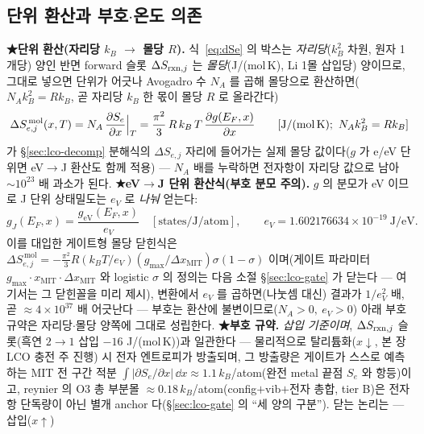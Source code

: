\subsection{단위 환산과 부호$\cdot$온도 의존}\label{sec:lco-Se-units}
\textbf{★단위 환산(자리당 $k_B$ $\to$ 몰당 $R$).} 식~\eqref{eq:dSe} 의 박스는 \emph{자리당}($k_B^2$ 차원, 원자 1개당) 양인 반면 forward 슬롯
$\Delta S_{\mathrm{rxn},j}$ 는 \emph{몰당}(J/(mol\,K), Li 1몰 삽입당) 양이므로, 그대로 넣으면 단위가 어긋나 Avogadro 수
$N_A$ 를 곱해 몰당으로 환산하면($N_A k_B^2=R k_B$, 곧 자리당 $k_B$ 한 몫이 몰당 $R$ 로 올라간다)
\begin{equation}
\Delta S_{e,j}^{\,\mathrm{mol}}(x,T)=N_A\,\frac{\partial S_e}{\partial x}\Big|_T
=\frac{\pi^2}{3}\,R\,k_B\,T\,\frac{\partial g(E_F,x)}{\partial x}
\qquad[\text{J/(mol\,K)};\ N_A k_B^2=R k_B]
\label{eq:dSemolar}
\end{equation}
가 \S\ref{sec:lco-decomp} 분해식의 $\Delta S_{e,j}$ 자리에 들어가는 실제 몰당 값이다($g$ 가 e/eV 단위면 eV$\to$J
환산도 함께 적용) --- $N_A$ 배를 누락하면 전자항이 자리당 값으로 남아 $\sim10^{23}$ 배 과소가 된다.
\textbf{★eV$\to$J 단위 환산식(부호 분모 주의).} $g$ 의 분모가 eV 이므로 J 단위 상태밀도는 $e_V$ 로 \emph{나눠} 얻는다:
\begin{equation}
g_J(E_F,x)=\frac{g_{\mathrm{eV}}(E_F,x)}{e_V}\quad[\text{states/J/atom}],
\qquad e_V=1.602176634\times10^{-19}\ \text{J/eV}.
\label{eq:gunit}
\end{equation}
이를 대입한 게이트형 몰당 닫힌식은 $\Delta S_{e,j}^{\,\mathrm{mol}}=-\tfrac{\pi^2}{3}R(k_BT/e_V)(g_{\max}/
\Delta x_\mathrm{MIT})\sigma(1-\sigma)$ 이며(게이트 파라미터 $g_{\max}\cdot x_\mathrm{MIT}\cdot\Delta x_\mathrm{MIT}$
와 logistic $\sigma$ 의 정의는 다음 소절 \S\ref{sec:lco-gate} 가 닫는다 --- 여기서는 그 닫힌꼴을 미리 제시),
변환에서 $e_V$ 를 곱하면(나눗셈 대신) 결과가 $1/e_V^2$ 배, 곧
$\approx4\times10^{37}$ 배 어긋난다 --- 부호는
환산에 불변이므로($N_A>0,\ e_V>0$) 아래 부호 규약은 자리당$\cdot$몰당 양쪽에 그대로 성립한다. \textbf{★부호 규약.} \emph{삽입 기준이며}, $\Delta S_{\mathrm{rxn},j}$ 슬롯(흑연 $2\!\to\!1$ 삽입 $-16$ J/(mol\,K))과 일관한다 --- 물리적으로
탈리튬화($x\!\downarrow$, 본 장 LCO 충전 주 진행) 시 전자 엔트로피가 방출되며, 그 방출량은 게이트가 스스로
예측하는 MIT 전 구간 적분 $\int|\partial S_e/\partial x|\,\dd x\approx1.1\,k_B$/atom(완전 metal 끝점 $S_e$ 와
항등)이고, reynier\cite{reynier2004} 의 O3 총 부분몰 $\approx0.18\,k_B$/atom(config$+$vib$+$전자 총합, tier B)은
전자항 단독량이 아닌 별개 anchor 다(\S\ref{sec:lco-gate} 의 ``세 양의 구분''). 닫는 논리는 --- 삽입($x\!\uparrow$)
